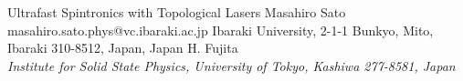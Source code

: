 \begin{conf-abstract}[]
{Ultrafast Spintronics with Topological Lasers}
{\color{blue} Masahiro Sato}
{masahiro.sato.phys@vc.ibaraki.ac.jp}
{Ibaraki University, 2-1-1 Bunkyo, Mito, Ibaraki 310-8512, Japan, Japan}
{{\color{blue}H. Fujita}\\ \textit{Institute for Solid State Physics, University of Tokyo, Kashiwa 277-8581, Japan}\\ 
\decofourleft \decofourright}





\printbibliography[heading=none]

\end{conf-abstract}
